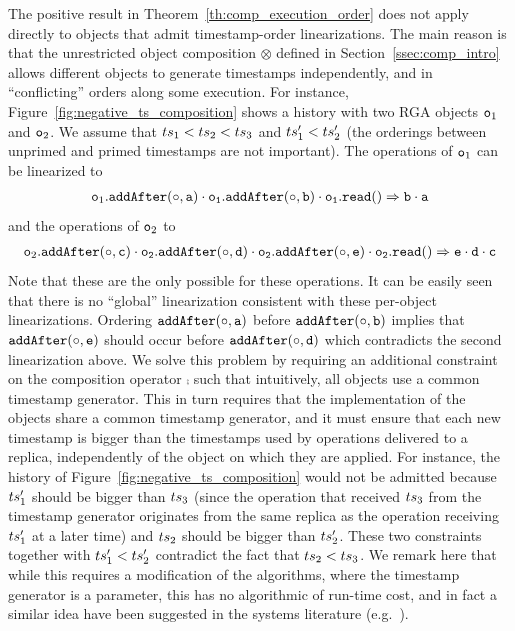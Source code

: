 The positive result in Theorem~\ref{th:comp_execution_order} does not apply directly to objects that admit timestamp-order linearizations. The main reason is that the unrestricted object composition $\otimes$ defined in Section~\ref{ssec:comp_intro} allows different objects to generate timestamps independently, and in ``conflicting'' orders along some execution. For instance, Figure~\ref{fig:negative_ts_composition} shows a history with two RGA objects $\mathtt{o}_1$ and $\mathtt{o}_2$. We assume that $ts_1 < ts_2 < ts_3$ and $ts'_1 < ts'_2$ (the orderings between unprimed and primed timestamps are not important). The operations of $\mathtt{o}_1$ can be linearized to
\begin{align*}
\aobj_1.\alabelshort[{\tt addAfter}]{\circ,a}\cdot \aobj_1.\alabelshort[{\tt addAfter}]{\circ,b}\cdot \aobj_1.\alabellongind[{\tt read}]{}{b\cdot a}{}
\end{align*}
and the operations of $\mathtt{o}_2$ to
\begin{align*}
\aobj_2.\alabelshort[{\tt addAfter}]{\circ,c}\cdot \aobj_2.\alabelshort[{\tt addAfter}]{\circ,d}\cdot \aobj_2.\alabelshort[{\tt addAfter}]{\circ,e}\cdot \aobj_2.\alabellongind[{\tt read}]{}{e\cdot d\cdot c}{}
\end{align*}
Note that these are the only  possible for these operations. It can be easily seen that there is no ``global'' linearization consistent with these per-object linearizations. Ordering $\alabelshort[{\tt addAfter}]{\circ,a}$ before $\alabelshort[{\tt addAfter}]{\circ,b}$ implies that $\alabelshort[{\tt addAfter}]{\circ,e}$ should occur before $\alabelshort[{\tt addAfter}]{\circ,d}$ which contradicts the second linearization above.
We solve this problem by requiring an additional constraint on the composition operator $\comp$ such that intuitively, all objects use a common timestamp generator. This in turn requires that the implementation of the objects share a common timestamp generator, and it must ensure that each new timestamp is bigger than the  timestamps used by operations delivered to a replica, independently of the object on which they are applied. For instance, the history of Figure~\ref{fig:negative_ts_composition} would not be admitted because $ts_1'$ should be bigger than $ts_3$ (since the operation that received $ts_3$ from the timestamp generator originates from the same replica as the operation receiving $ts_1'$ at a later time) and $ts_2$ should be bigger than $ts_2'$. These two constraints together with $ts_1'<ts_2'$ contradict the fact that $ts_2 < ts_3$.
%
We remark here that while this requires a modification of the algorithms, where the timestamp generator is a parameter, this has no algorithmic of run-time cost, and in fact a similar idea have been suggested in the systems literature (e.g.~\cite{EnesPB17}).

